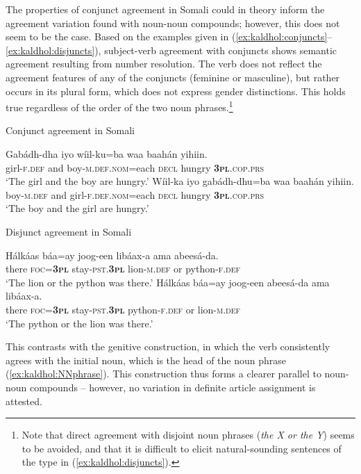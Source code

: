 \documentclass[output=paper]{langscibook}
\begin{document}
The properties of conjunct agreement in Somali could in theory inform the agreement variation found with noun-noun compounds; however, this does not seem to be the case. Based on the examples given in (\ref{ex:kaldhol:conjuncts}--\ref{ex:kaldhol:disjuncts}), subject-verb agreement with conjuncts shows semantic agreement resulting from number resolution. The verb does not reflect the agreement features of any of the conjuncts (feminine or masculine), but rather occurs in its plural form, which does not express gender distinctions. This holds true regardless of the order of the two noun phrases.\footnote{Note that direct agreement with disjoint noun phrases (\textit{the X or the Y}) seems to be avoided, and that it is difficult to elicit natural-sounding sentences of the type in (\ref{ex:kaldhol:disjuncts}).}

\ea\label{ex:kaldhol:conjuncts}
	Conjunct agreement in Somali
	\begin{xlist}
		\ex
		\gll Gabádh-dha iyo wíil-ku=ba waa baahán yihiin.\\
		girl-\textsc{f.def} and boy-\textsc{m.def.nom}=each \textsc{decl} hungry \textsc{\textbf{3pl}.cop.prs}\\
		\glt `The girl and the boy are hungry.'
		\ex
		\gll Wíil-ka iyo gabádh-dhu=ba waa baahán yihiin.\\
		boy-\textsc{m.def} and girl-\textsc{f.def.nom}=each \textsc{decl} hungry \textsc{\textbf{3pl}.cop.prs}\\
		\glt `The boy and the girl are hungry.'
	\end{xlist}
\ex\label{ex:kaldhol:disjuncts}
	Disjunct agreement in Somali
	\begin{xlist}
		\ex
		\gll Hálkáas báa=ay joog-een libáax-a ama abeesá-da.\\
		there \textsc{foc}=\textsc{\textbf{3pl}} stay-\textsc{pst.\textbf{3pl}} lion-\textsc{m.def} or python-\textsc{f.def}\\
		\glt `The lion or the python was there.'
		\ex
		\gll Hálkáas báa=ay joog-een abeesá-da ama libáax-a.\\
		there \textsc{foc}=\textsc{\textbf{3pl}} stay-\textsc{pst.\textbf{3pl}} python-\textsc{f.def} or lion-\textsc{m.def}\\
		\glt `The python or the lion was there.'
	\end{xlist}
\z
This contrasts with the genitive construction, in which the verb consistently agrees with the initial noun, which is the head of the noun phrase (\ref{ex:kaldhol:NNphrase}). This construction thus forms a clearer parallel to noun-noun compounds -- however, no variation in definite article assignment is attested.
\end{document}
